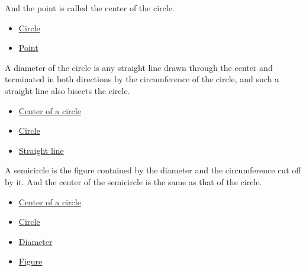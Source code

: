 \begin{definition}
\label{def-euclid-center-of-a-circle}
And the point is called the center of the circle.
\end{definition}
\begin{lra-not-visible}
\begin{dependencies}
\begin{itemize}
  \item \hyperref[def-euclid-circle]{Circle}
  \item \hyperref[def-euclid-point]{Point}
\end{itemize}
\end{dependencies}
\end{lra-not-visible}

\begin{definition}[Diameter]
\label{def-euclid-diameter}
A diameter of the circle is any straight line drawn through the center and
terminated in both directions by the circumference of the circle, and such a
straight line also bisects the circle.
\end{definition}
\begin{lra-not-visible}
\begin{dependencies}
\begin{itemize}
  \item \hyperref[def-euclid-center-of-a-circle]{Center of a circle}
  \item \hyperref[def-euclid-circle]{Circle}
  \item \hyperref[def-euclid-straight-line]{Straight line}
\end{itemize}
\end{dependencies}
\end{lra-not-visible}

\begin{definition}[Semicircle]
\label{def-euclid-semicircle}
A semicircle is the figure contained by the diameter and the circumference cut
off by it. And the center of the semicircle is the same as that of the circle.
\end{definition}
\begin{lra-not-visible}
\begin{dependencies}
\begin{itemize}
  \item \hyperref[def-euclid-center-of-a-circle]{Center of a circle}
  \item \hyperref[def-euclid-circle]{Circle}
  \item \hyperref[def-euclid-diameter]{Diameter}
  \item \hyperref[def-euclid-figure]{Figure}
\end{itemize}
\end{dependencies}
\end{lra-not-visible}

